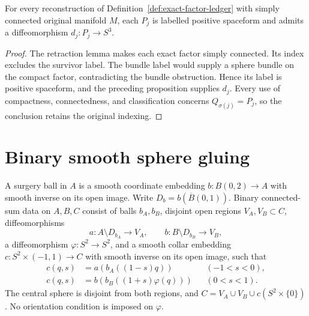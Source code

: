 \begin{theorem}
\label{thm:exact-sphere-factors}
For every reconstruction of Definition~\ref{def:exact-factor-ledger}
with simply connected original manifold $M$, each $P_j$ is labelled
positive spaceform and admits a diffeomorphism $d_j:P_j\to S^3$.
\end{theorem}

\begin{proof}
The retraction lemma makes each exact factor simply connected.
Its index excludes the survivor label.  The bundle label would supply
a sphere bundle on the compact factor, contradicting the bundle
obstruction.  Hence its label is positive spaceform, and the preceding
proposition supplies $d_j$.  Every use of compactness, connectedness,
and classification concerns $Q_{\sigma(j)}=P_j$, so the conclusion
retains the original indexing.
\end{proof}

\section{Binary smooth sphere gluing}
\label{sec:binary-sphere-gluing}

\begin{definition}
\label{def:sphere-binary-data}
A surgery ball in $A$ is a smooth coordinate embedding
$b:B(0,2)\to A$ with smooth inverse on its open image.  Write
$D_b=b(\overline B(0,1))$.  Binary connected-sum data on $A,B,C$ consist
of balls $b_A,b_B$, disjoint open regions $V_A,V_B\subset C$,
diffeomorphisms
\[
 a:A\setminus D_{b_A}\to V_A,\qquad
 b:B\setminus D_{b_B}\to V_B,
\]
a diffeomorphism $\varphi:S^2\to S^2$, and a smooth collar embedding
$c:S^2\times(-1,1)\to C$ with smooth inverse on its open image, such that
\[
 \begin{aligned}
 c(q,s)&=a(b_A((1-s)q))&&(-1<s<0),\\
 c(q,s)&=b(b_B((1+s)\varphi(q)))&&(0<s<1).
 \end{aligned}
\]
The central sphere is disjoint from both regions, and
$C=V_A\cup V_B\cup c(S^2\times\{0\})$.
No orientation condition is imposed on $\varphi$.
\end{definition}

